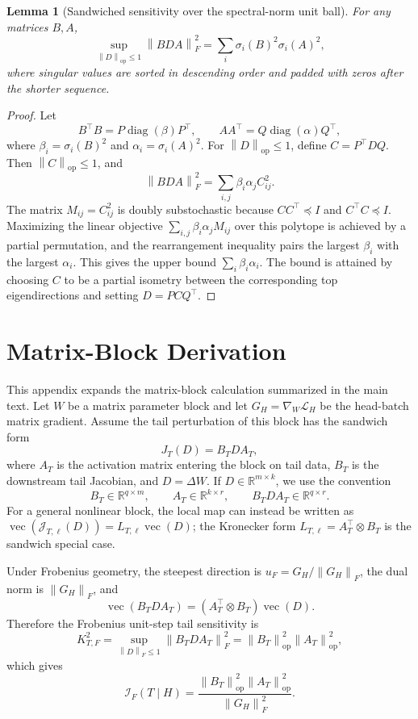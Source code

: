\documentclass{article}
\newtheorem{lemma}[theorem]{Lemma}
\theoremstyle{definition}
\newcommand{\R}{\mathbb{R}}
\newcommand{\Loss}{\mathcal L}
\newcommand{\I}{\mathcal I}
\newcommand{\op}{\mathrm{op}}
\newcommand{\norm}[1]{\left\lVert #1 \right\rVert}
\newcommand{\vecop}{\operatorname{vec}}
\begin{document}
\begin{lemma}[Sandwiched sensitivity over the spectral-norm unit ball]
\label{lem:sandwiched-sensitivity}
For any matrices \(B,A\),
\[
\sup_{\norm{D}_{\op}\le 1}\norm{BDA}_F^2
=
\sum_i\sigma_i(B)^2\sigma_i(A)^2,
\]
where singular values are sorted in descending order and padded with zeros after the shorter sequence.
\end{lemma}

\begin{proof}
Let
\[
B^\top B=P\operatorname{diag}(\beta)P^\top,
\qquad
AA^\top=Q\operatorname{diag}(\alpha)Q^\top,
\]
where \(\beta_i=\sigma_i(B)^2\) and \(\alpha_i=\sigma_i(A)^2\). For \(\norm{D}_{\op}\le 1\), define \(C=P^\top DQ\). Then \(\norm{C}_{\op}\le 1\), and
\[
\norm{BDA}_F^2
=
\sum_{i,j}\beta_i\alpha_j C_{ij}^2.
\]
The matrix \(M_{ij}=C_{ij}^2\) is doubly substochastic because \(CC^\top\preceq I\) and \(C^\top C\preceq I\). Maximizing the linear objective \(\sum_{i,j}\beta_i\alpha_jM_{ij}\) over this polytope is achieved by a partial permutation, and the rearrangement inequality pairs the largest \(\beta_i\) with the largest \(\alpha_i\). This gives the upper bound \(\sum_i\beta_i\alpha_i\). The bound is attained by choosing \(C\) to be a partial isometry between the corresponding top eigendirections and setting \(D=PCQ^\top\).
\end{proof}

\section{Matrix-Block Derivation}
\label{app:matrix-block-derivation}

This appendix expands the matrix-block calculation summarized in the main text. Let \(W\) be a matrix parameter block and let \(G_H=\nabla_W\Loss_H\) be the head-batch matrix gradient. Assume the tail perturbation of this block has the sandwich form
\[
J_T(D)=B_TDA_T,
\]
where \(A_T\) is the activation matrix entering the block on tail data, \(B_T\) is the downstream tail Jacobian, and \(D=\Delta W\). If \(D\in\R^{m\times k}\), we use the convention
\[
B_T\in\R^{q\times m},
\qquad
A_T\in\R^{k\times r},
\qquad
B_TDA_T\in\R^{q\times r}.
\]
For a general nonlinear block, the local map can instead be written as \(\vecop(\mathcal{J}_{T,\ell}(D))=L_{T,\ell}\vecop(D)\); the Kronecker form \(L_{T,\ell}=A_T^\top\otimes B_T\) is the sandwich special case.

Under Frobenius geometry, the steepest direction is \(u_F=G_H/\norm{G_H}_F\), the dual norm is \(\norm{G_H}_F\), and
\[
\vecop(B_TDA_T)=(A_T^\top\otimes B_T)\vecop(D).
\]
Therefore the Frobenius unit-step tail sensitivity is
\[
K_{T,F}^2
=
\sup_{\norm{D}_F\le 1}
\norm{B_TDA_T}_F^2
=
\norm{B_T}_{\op}^2
\norm{A_T}_{\op}^2,
\]
which gives
\[
\I_F(T\mid H)
=
\frac{
\norm{B_T}_{\op}^2
\norm{A_T}_{\op}^2
}{
\norm{G_H}_F^2
}.
\]
\end{document}
